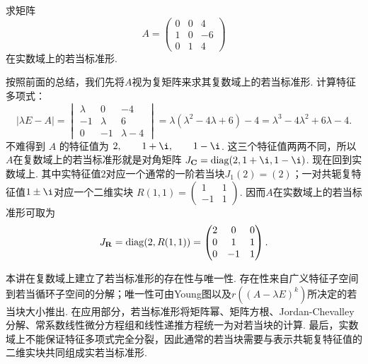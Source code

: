 \begin{example}{}{}
    求矩阵
    \[
        A=\begin{pmatrix}
            0 & 0 & 4 \\
            1 & 0 & -6 \\
            0 & 1 & 4
        \end{pmatrix}
    \]
    在实数域上的若当标准形.
\end{example}
\begin{solution}
    按照前面的总结，我们先将$A$视为复矩阵来求其复数域上的若当标准形. 计算特征多项式：
    \[
        |\lambda E-A|
        =\begin{vmatrix}
            \lambda & 0 & -4 \\
            -1 & \lambda & 6 \\
            0 & -1 & \lambda-4
        \end{vmatrix}
        =\lambda(\lambda^2-4\lambda+6)-4
        =\lambda^3-4\lambda^2+6\lambda-4.
    \]
    不难得到 $A$ 的特征值为 $2,\qquad 1+\i,\qquad 1-\i$. 这三个特征值两两不同，所以$A$在复数域上的若当标准形就是对角矩阵 $J_{\mathbf{C}}=\diag(2,1+\i,1-\i)$. 现在回到实数域上. 其中实特征值$2$对应一个通常的一阶若当块$J_1(2)=(2)$；一对共轭复特征值$1\pm\i$对应一个二维实块 $R(1,1)=\begin{pmatrix}
            1 & 1 \\
            -1 & 1
        \end{pmatrix}$. 因而$A$在实数域上的若当标准形可取为
    \[
        J_{\mathbf{R}}=\operatorname{diag}(2,R(1,1))
        =\begin{pmatrix}
            2 & 0 & 0 \\
            0 & 1 & 1 \\
            0 & -1 & 1
        \end{pmatrix}.
    \]
\end{solution}

\begin{summary}
    本讲在复数域上建立了若当标准形的存在性与唯一性. 存在性来自广义特征子空间到若当循环子空间的分解；唯一性可由Young图以及$r((A-\lambda E)^k)$所决定的若当块大小推出. 在应用部分，若当标准形将矩阵幂、矩阵方根、Jordan-Chevalley分解、常系数线性微分方程组和线性递推方程统一为对若当块的计算. 最后，实数域上不能保证特征多项式完全分裂，因此通常的若当块需要与表示共轭复特征值的二维实块共同组成实若当标准形.

\end{summary}

